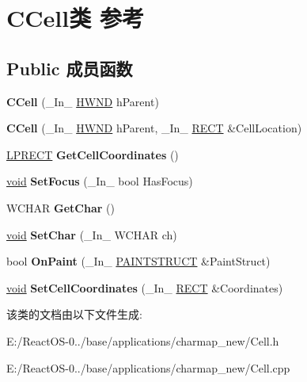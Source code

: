 \hypertarget{class_c_cell}{}\section{C\+Cell类 参考}
\label{class_c_cell}
\subsection*{Public 成员函数}
\begin{DoxyCompactItemize}
\item 
\mbox{\label{class_c_cell_af24ff44fdb5b2c8fc4b548a983292f4c}} 
{\bfseries C\+Cell} (\+\_\+\+In\+\_\+ \hyperlink{interfacevoid}{H\+W\+ND} h\+Parent)
\item 
\mbox{\label{class_c_cell_ad0301b5ccce38232ae98030f9d2be2e4}} 
{\bfseries C\+Cell} (\+\_\+\+In\+\_\+ \hyperlink{interfacevoid}{H\+W\+ND} h\+Parent, \+\_\+\+In\+\_\+ \hyperlink{structtag_r_e_c_t}{R\+E\+CT} \&Cell\+Location)
\item 
\mbox{\label{class_c_cell_a2f3f098106848209b4da0a036407586a}} 
\hyperlink{structtag_r_e_c_t}{L\+P\+R\+E\+CT} {\bfseries Get\+Cell\+Coordinates} ()
\item 
\mbox{\label{class_c_cell_ab603ede25a480ae36adffb970d23592f}} 
\hyperlink{interfacevoid}{void} {\bfseries Set\+Focus} (\+\_\+\+In\+\_\+ bool Has\+Focus)
\item 
\mbox{\label{class_c_cell_a3234ba3132cdbd48c3e5ff1472ab48bd}} 
W\+C\+H\+AR {\bfseries Get\+Char} ()
\item 
\mbox{\label{class_c_cell_ab78ddbf8763675a33801f15bf93f6d33}} 
\hyperlink{interfacevoid}{void} {\bfseries Set\+Char} (\+\_\+\+In\+\_\+ W\+C\+H\+AR ch)
\item 
\mbox{\label{class_c_cell_a24bb294962698a94193ad14223817fc0}} 
bool {\bfseries On\+Paint} (\+\_\+\+In\+\_\+ \hyperlink{structtag_p_a_i_n_t_s_t_r_u_c_t}{P\+A\+I\+N\+T\+S\+T\+R\+U\+CT} \&Paint\+Struct)
\item 
\mbox{\label{class_c_cell_a807eb358ca2c28ad51459abacceb8c20}} 
\hyperlink{interfacevoid}{void} {\bfseries Set\+Cell\+Coordinates} (\+\_\+\+In\+\_\+ \hyperlink{structtag_r_e_c_t}{R\+E\+CT} \&Coordinates)
\end{DoxyCompactItemize}


该类的文档由以下文件生成\+:\begin{DoxyCompactItemize}
\item 
E\+:/\+React\+O\+S-\/0../base/applications/charmap\+\_\+new/Cell.\+h\item 
E\+:/\+React\+O\+S-\/0../base/applications/charmap\+\_\+new/Cell.\+cpp\end{DoxyCompactItemize}
